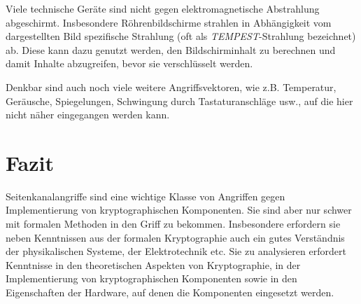Viele technische Geräte sind nicht gegen elektromagnetische Abstrahlung
abgeschirmt. Insbesondere Röhrenbildschirme strahlen in Abhängigkeit vom
dargestellten Bild spezifische Strahlung (oft als
\emph{TEMPEST}-Strahlung bezeichnet) ab. Diese kann dazu genutzt werden,
den Bildschirminhalt zu berechnen und damit Inhalte abzugreifen, bevor
sie verschlüsselt werden.

Denkbar sind auch noch viele weitere Angriffsvektoren, wie
z.B. Temperatur, Geräusche, Spiegelungen, Schwingung durch Tastaturanschläge usw.,
auf die hier nicht näher eingegangen werden kann. 


\section{Fazit}
Seitenkanalangriffe sind eine wichtige Klasse von Angriffen gegen
Implementierung von kryptographischen Komponenten. Sie sind aber nur
schwer mit formalen Methoden in den Griff zu bekommen. Insbesondere
erfordern sie neben Kenntnissen aus der formalen Kryptographie auch ein
gutes Verständnis der physikalischen Systeme, der Elektrotechnik etc.
Sie zu analysieren erfordert Kenntnisse in den theoretischen Aspekten
von Kryptographie, in der Implementierung von kryptographischen
Komponenten sowie in den Eigenschaften der Hardware, auf denen die
Komponenten eingesetzt werden.
